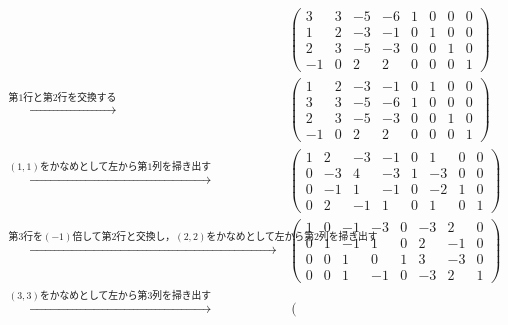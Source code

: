 \documentclass[uplatex,dvipdfmx,a4paper,10pt,fleqn]{jsarticle}
\begin{document}
\begin{leftbar}
        \begin{align*} 
        &
        \left( 
            \begin{array}{cccc|cccc}
            3 & 3 & -5 & -6 & 1 & 0 & 0 & 0\\ 
            1 & 2 & -3 & -1 & 0 & 1 & 0 & 0 \\ 
            2 & 3 & -5 & -3 & 0 & 0 & 1 & 0 \\
            -1 & 0 & 2 & 2 & 0 & 0 & 0 & 1 
            \end{array}
            \right) \\
           \xrightarrow{\text{第$1$行と第$2$行を交換する}} &
            \left( \begin{array}{cccc|cccc}
                1 & 2 & -3 & -1 & 0 & 1 & 0 & 0 \\ 
                3 & 3 & -5 & -6 & 1 & 0 & 0 & 0\\ 
                2 & 3 & -5 & -3 & 0 & 0 & 1 & 0 \\
                -1 & 0 & 2 & 2 & 0 & 0 & 0 & 1 
                \end{array}
                \right)\\
           \xrightarrow{\text{$(1,1)$をかなめとして左から第1列を掃き出す}} &
           \left( \begin{array}{cccc|cccc}
            1 & 2 & -3 & -1 & 0 & 1 & 0 & 0 \\ 
            0 & -3 & 4 & -3 & 1 & -3 & 0 & 0\\ 
            0 & -1 & 1 & -1 & 0 & -2 & 1 & 0 \\
            0 & 2 & -1 & 1 & 0 & 1 & 0 & 1 
            \end{array}
            \right)\\
            \xrightarrow{\text{第$3$行を$(-1)$倍して第2行と交換し，$(2,2)$をかなめとして左から第$2$列を掃き出す}} &
           \left( \begin{array}{cccc|cccc}
            1 & 0 & -1 & -3 & 0 & -3 & 2 & 0 \\ 
            0 & 1 & -1 & 1 & 0 & 2 & -1 & 0 \\
            0 & 0 & 1 & 0 & 1 & 3 & -3 & 0\\ 
            0 & 0 & 1 & -1 & 0 & -3 & 2 & 1 
            \end{array}
            \right)\\
            \xrightarrow{\text{$(3,3)$をかなめとして左から第$3$列を掃き出す}} &
            \left( \begin{array}{cccc|cccc}

\end{array}
\end{align*}
\end{leftbar}
\end{document}
